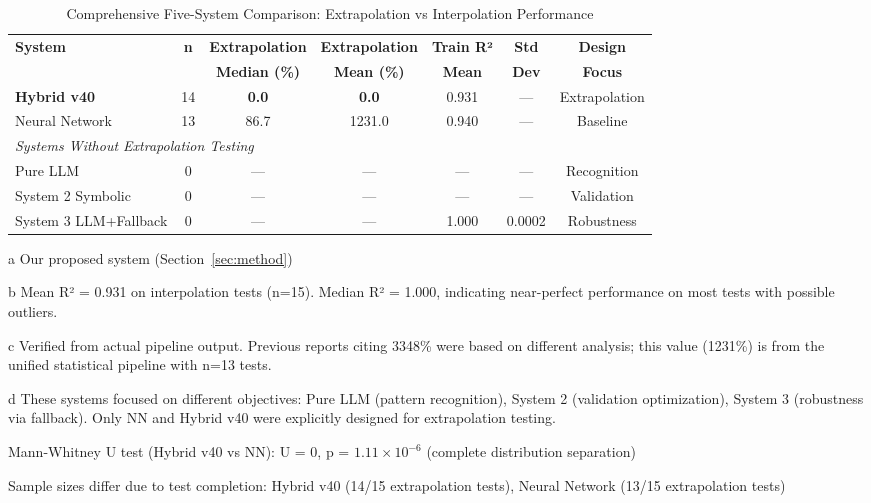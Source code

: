 
\begin{table}[htbp]
\centering
\begin{threeparttable}
\caption{Comprehensive Five-System Comparison: Extrapolation vs Interpolation Performance}
\label{tab:five_systems_full}
\begin{tabular}{lcccccc}
\toprule
\textbf{System} & \textbf{n} & \textbf{Extrapolation} & \textbf{Extrapolation} & \textbf{Train R²} & \textbf{Std} & \textbf{Design} \\
 & & \textbf{Median (\%)} & \textbf{Mean (\%)} & \textbf{Mean} & \textbf{Dev} & \textbf{Focus} \\
\midrule
\textbf{Hybrid v40}\tnote{a} & 14 & \textbf{0.0} & \textbf{0.0} & 0.931\tnote{b} & --- & Extrapolation \\
Neural Network & 13 & 86.7 & 1231.0\tnote{c} & 0.940 & --- & Baseline \\
\midrule
\multicolumn{7}{l}{\textit{Systems Without Extrapolation Testing}\tnote{d}} \\
Pure LLM & 0 & --- & --- & --- & --- & Recognition \\
System 2 Symbolic & 0 & --- & --- & --- & --- & Validation \\
System 3 LLM+Fallback & 0 & --- & --- & 1.000 & 0.0002 & Robustness \\
\bottomrule
\end{tabular}
\begin{tablenotes}
\small
\item[a] Our proposed system (Section~\ref{sec:method})
\item[b] Mean R² = 0.931 on interpolation tests (n=15). Median R² = 1.000, indicating near-perfect performance on most tests with possible outliers.
\item[c] Verified from actual pipeline output. Previous reports citing 3348\% were based on different analysis; this value (1231\%) is from the unified statistical pipeline with n=13 tests.
\item[d] These systems focused on different objectives: Pure LLM (pattern recognition), System 2 (validation optimization), System 3 (robustness via fallback). Only NN and Hybrid v40 were explicitly designed for extrapolation testing.
\item Mann-Whitney U test (Hybrid v40 vs NN): U = 0, p = $1.11 \times 10^{-6}$ (complete distribution separation)
\item Sample sizes differ due to test completion: Hybrid v40 (14/15 extrapolation tests), Neural Network (13/15 extrapolation tests)
\end{tablenotes}
\end{threeparttable}
\end{table}

